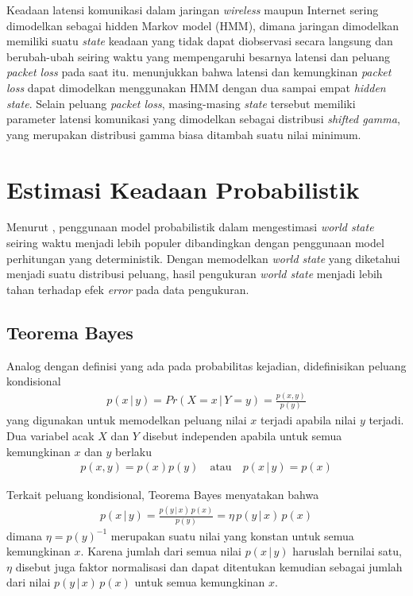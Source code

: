 Keadaan latensi komunikasi dalam jaringan \textit{wireless} maupun Internet sering dimodelkan sebagai hidden Markov model (HMM), dimana jaringan dimodelkan memiliki suatu \textit{state} keadaan yang tidak dapat diobservasi secara langsung dan berubah-ubah seiring waktu yang mempengaruhi besarnya latensi dan peluang \textit{packet loss} pada saat itu. \citet{rossi2006} menunjukkan bahwa latensi dan kemungkinan \textit{packet loss} dapat dimodelkan menggunakan HMM dengan dua sampai empat \textit{hidden state}. Selain peluang \textit{packet loss}, masing-masing \textit{state} tersebut memiliki parameter latensi komunikasi yang dimodelkan sebagai distribusi \textit{shifted gamma}, yang merupakan distribusi gamma biasa ditambah suatu nilai minimum.

\section{Estimasi Keadaan Probabilistik}

Menurut \citet{thrun2010}, penggunaan model probabilistik dalam mengestimasi \textit{world state} seiring waktu menjadi lebih populer dibandingkan dengan penggunaan model perhitungan yang deterministik. Dengan memodelkan \textit{world state} yang diketahui menjadi suatu distribusi peluang, hasil pengukuran \textit{world state} menjadi lebih tahan terhadap efek \textit{error} pada data pengukuran.

\subsection{Teorema Bayes}
Analog dengan definisi yang ada pada probabilitas kejadian, didefinisikan peluang kondisional
\begin{align}
    p(x \,|\, y) = Pr(X = x \,|\, Y = y) = \frac{p(x, y)}{p(y)}
\end{align}
yang digunakan untuk memodelkan peluang nilai $x$ terjadi apabila nilai $y$ terjadi. Dua variabel acak $X$ dan $Y$ disebut independen apabila untuk semua kemungkinan $x$ dan $y$ berlaku
\begin{align}
    p(x, y) = p(x) p(y) \quad\text{atau}\quad p(x \,|\, y) = p(x)
\end{align}

Terkait peluang kondisional, Teorema Bayes menyatakan bahwa
\begin{align}
    p(x \,|\, y) = \frac{p(y \,|\, x)\, p(x)}{p(y)} = \eta\, p(y \,|\, x)\, p(x)
\end{align}
dimana $\eta = p(y)^{-1}$ merupakan suatu nilai yang konstan untuk semua kemungkinan $x$. Karena jumlah dari semua nilai $p(x \,|\, y)$ haruslah bernilai satu, $\eta$ disebut juga faktor normalisasi dan dapat ditentukan kemudian sebagai jumlah dari nilai $p(y \,|\, x)\, p(x)$ untuk semua kemungkinan $x$.

